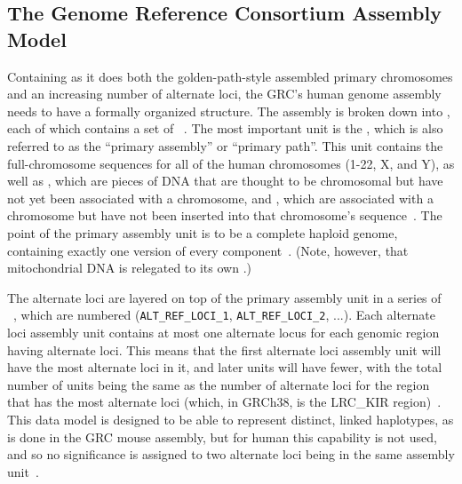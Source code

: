 \subsection{The Genome Reference Consortium Assembly Model}

    
Containing as it does both the golden-path-style assembled primary chromosomes and an increasing number of alternate loci, the GRC's human genome assembly needs to have a formally organized structure. The assembly is broken down into , each of which contains a set of ~\cite{schneider2013genome}. The most important unit is the , which is also referred to as the ``primary assembly'' or ``primary path''. This unit contains the full-chromosome sequences for all of the human chromosomes (1-22, X, and Y), as well as , which are pieces of DNA that are thought to be chromosomal but have not yet been associated with a chromosome, and , which are associated with a chromosome but have not been inserted into that chromosome's sequence~\cite{schneider2013genome}. The point of the primary assembly unit is to be a complete haploid genome, containing exactly one version of every component~\cite{schneider2013genome}. (Note, however, that mitochondrial DNA is relegated to its own .)

The alternate loci are layered on top of the primary assembly unit in a series of ~\cite{schneider2013genome}, which are numbered (\texttt{ALT\_REF\_LOCI\_1}, \texttt{ALT\_REF\_LOCI\_2}, ...). Each alternate loci assembly unit contains at most one alternate locus for each genomic region having alternate loci. This means that the first alternate loci assembly unit will have the most alternate loci in it, and later units will have fewer, with the total number of units being the same as the number of alternate loci for the region that has the most alternate loci (which, in GRCh38, is the LRC\_KIR region)~\cite{grc2013announcing,schneider2013genome}. This data model is designed to be able to represent distinct, linked haplotypes, as is done in the GRC mouse assembly, but for human this capability is not used, and so no significance is assigned to two alternate loci being in the same assembly unit~\cite{schneider2013genome}.

